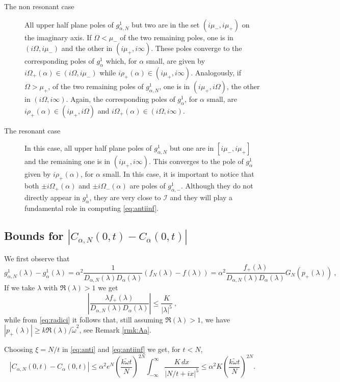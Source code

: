 \documentclass[11pt]{article}
\numberwithin{equation}{section}
\numberwithin{theorem}{section}
\newcommand{\matht}[1]{\texorpdfstring{#1}{}}
\def\tilde#1{\widetilde{#1}}
\begin{document}
\begin{description}
\item [The non resonant case] All upper half plane poles of $g^1_{\alpha, N}$ but two are in the set $(i\mu_-,i\mu_+)$
on the imaginary axis. If $\Omega<\mu_-$ of the two remaining poles, one is in $(i\Omega,i\mu_-)$ and the other in
$(i\mu_+,i\infty)$. These poles converge to the corresponding poles of $g^1_{\alpha}$ which, for $\alpha$ small, are
given by $i\Omega_+(\alpha)\in (i\Omega,i\mu_-)$ while $i\rho_+(\alpha)\in (i\mu_+,i\infty)$. Analogously, if
$\Omega>\mu_+$, of the two remaining poles of $g^1_{\alpha,N}$, one is in $(i\mu_+,i\Omega)$, the other in
$(i\Omega,i\infty)$. Again, the corresponding poles of $g^1_\alpha$, for $\alpha$ small, are $i\rho_+(\alpha)\in
(i\mu_+,i\Omega)$ and $i\Omega_+(\alpha)\in (i\Omega,i\infty)$.

\item [The resonant case] In this case, all upper half plane poles of $g^1_{\alpha,N}$ but one are in $[i\mu_-,i\mu_+]$
and the remaining one is in $(i\mu_+,i\infty)$. This converges to the pole of $g^1_\alpha$ given by $i\rho_+(\alpha)$,
for $\alpha$ small. In this case, it is important to notice that both $\pm i\Omega_+(\alpha)$ and $\pm
i\Omega_-(\alpha)$ are poles of $g^1_{\alpha,-}$. Although they do not directly appear in $g^1_\alpha$, they are very
close to $\mathcal I$ and they will play a fundamental role in computing \eqref{eq:antiinf}.

\end{description}

\subsection{Bounds for \matht{$|C_{\alpha,N}(0,t)-C_{\alpha}(0,t)|$}}\label{subsec:bound}

We first observe that
\[
g^1_{\alpha,N}(\lambda)-g^1_\alpha(\lambda) = \alpha^2\frac{1}
{D_{\alpha,N}(\lambda)D_\alpha(\lambda)}(f_N(\lambda)-
f(\lambda))
=\alpha^2\frac{f_+(\lambda)}
{D_{\alpha,N}(\lambda)D_\alpha(\lambda)}G_N(p_+(\lambda))\ ,
\]
If we take $\lambda$ with $\Re(\lambda)>1$ we get
\[
\left| \frac{\lambda f_+(\lambda)}
{D_{\alpha,N}(\lambda)D_\alpha(\lambda)}\right|\leq\frac{K}{|\lambda|^{5}}\ ,
\]
while from \eqref{eq:radici} it follows that, still assuming $\Re(\lambda)>1$, we have $|p_+(\lambda)|\geq
k\Re(\lambda)/\tilde \omega^2$, see Remark \ref{rmk:Aa}.

Choosing $\xi=N/t$ in \eqref{eq:anti} and \eqref{eq:antiinf} we get, for $t<N$,
\begin{equation}\label{eq:N^N}
 |C_{\alpha,N}(0,t)-C_\alpha(0,t)|\leq \alpha^2
e^{N}\left(\frac{k\tilde\omega t}N\right)^{2N}
\int_{-\infty}^{\infty} \frac{K\,dx}{|N/t+ix|^5}\leq
\alpha^2 K\left(\frac{k\tilde\omega  t}N\right)^{2N}.
\end{equation}
\end{document}
